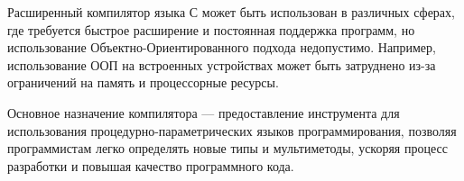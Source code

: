 Расширенный компилятор языка С может быть использован в различных сферах, где требуется быстрое расширение и постоянная поддержка программ, но использование Объектно-Ориентированного подхода недопустимо.
Например, использование ООП на встроенных устройствах может быть затруднено из-за ограничений на память и процессорные ресурсы.

Основное назначение компилятора --- предоставление инструмента для использования проце\-дурно-параметрических языков программирования, позволяя программистам легко определять новые типы и мультиметоды, ускоряя процесс разработки и повышая качество программного кода.
